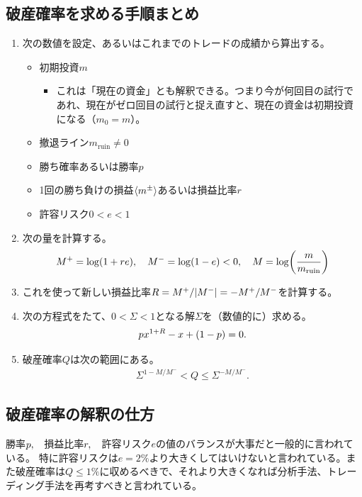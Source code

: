 \documentclass[twoside,openright,a4paper,papersize,uplatex,dvipdfmx]{jsarticle}
\newcommand{\rrr}{r} %
\begin{document}
  \subsection{破産確率を求める手順まとめ} \label{subsec: 破産確率を求める手順まとめ}
  \begin{enumerate}
    \item 次の数値を設定、あるいはこれまでのトレードの成績から算出する。
    \begin{itemize}
      \item 初期投資$m$
      \begin{itemize}
        \item これは「現在の資金」とも解釈できる。つまり今が何回目の試行であれ、現在がゼロ回目の試行と捉え直すと、現在の資金は初期投資になる（$m_{0} = m$）。
      \end{itemize}
      \item 撤退ライン$m_{\mathrm{ruin}} \neq 0$
      \item 勝ち確率あるいは勝率$p$
      \item 1回の勝ち負けの損益$\expval{m^{\pm}}$あるいは損益比率$\rrr$
      \item 許容リスク$0 < e < 1$
    \end{itemize}
    \item 次の量を計算する。
    \begin{align*}
      M^{+} = \log( 1 + \rrr e )  \qc
      M^{-} = \log(1 - e) < 0 \qc
      M = \log(
        \frac{
          m
        }{
          m_{\mathrm{ruin}}
        }
      )
    \end{align*}
    \item これを使って新しい損益比率$R = M^{+} / \abs{M^{-}} = - M^{+} / M^{-}$を計算する。
    \item 次の方程式をたて、$0 < \Sigma < 1$となる解$\Sigma$を（数値的に）求める。
    \begin{align*}
      p x^{1 + R} - x + \qty(1 - p) = 0.
    \end{align*}
    \item 破産確率$Q$は次の範囲にある。
    \begin{align*}
      \Sigma^{1 - M / M^{-}} < Q \le \Sigma^{- M / M^{-}}.
    \end{align*}
  \end{enumerate}

  \subsection{破産確率の解釈の仕方} \label{subsec: 破産確率の解釈の仕方}
  勝率$p \qc$損益比率$\rrr \qc$許容リスク$e$の値のバランスが大事だと一般的に言われている。
  特に許容リスクは$e = 2\%$より大きくしてはいけないと言われている。また破産確率は$Q \le 1\%$に収めるべきで、それより大きくなれば分析手法、トレーディング手法を再考すべきと言われている。
\end{document}
